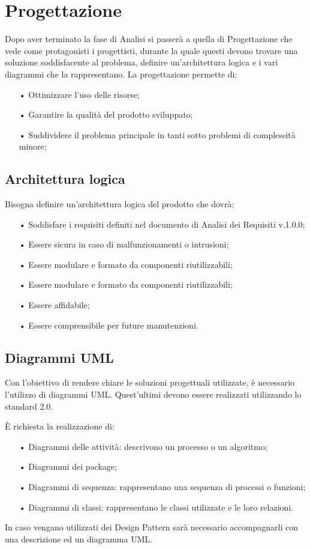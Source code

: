 \section{Progettazione}
Dopo aver terminato la fase di Analisi si passerà a quella di Progettazione che vede come protagonisti i progettisti, durante la quale questi devono trovare una soluzione soddisfacente al problema, definire un’architettura logica e i vari diagrammi che la rappresentano.
La progettazione permette di: 
\begin{itemize}
\item[•] Ottimizzare l'uso delle risorse;
\item[•] Garantire la qualità del prodotto sviluppato;
\item[•] Suddividere il problema principale in tanti sotto problemi di complessità minore;
\end{itemize}

\subsection{Architettura logica}
Bisogna definire un'architettura logica del prodotto che dovrà: 
\begin{itemize}
\item[•] Soddisfare i requisiti definiti nel documento di Analisi dei Requisiti v.1.0.0;
\item[•] Essere sicura in caso di malfunzionamenti o intrusioni;
\item[•] Essere modulare e formato da componenti riutilizzabili;
\item[•] Essere modulare e formato da componenti riutilizzabili;
\item[•] Essere affidabile;
\item[•] Essere comprensibile per future manutenzioni.
\end{itemize}
\subsection{Diagrammi UML}
Con l'obiettivo di rendere chiare le soluzioni progettuali utilizzate, è necessario l'utilizzo di {diagrammi UML}. Quest'ultimi devono essere realizzati utilizzando lo standard 2.0.

È richiesta la realizzazione di:
\begin{itemize}
\item[•] Diagrammi delle attività: descrivono un processo o un algoritmo;
\item[•] Diagrammi dei package;
\item[•] Diagrammi di sequenza: rappresentano una sequenza di processi o funzioni;
\item[•] Diagrammi di classi: rappresentano le classi utilizzate e le loro relazioni.
\end{itemize}
In caso vengano utilizzati dei Design Pattern sarà necessario accompagnarli con una descrizione ed un diagramma UML.

